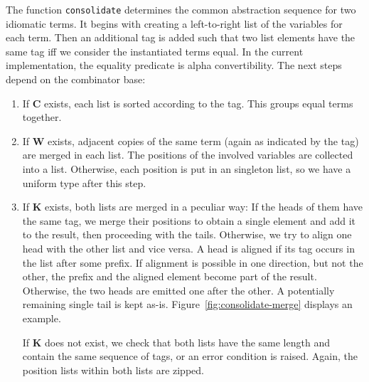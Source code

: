 The function \texttt{consolidate} determines the common abstraction sequence
for two idiomatic terms.
It begins with creating a left-to-right list of the variables for each term.
Then an additional tag is added such that two list elements have the same
tag iff we consider the instantiated terms equal.
In the current implementation, the equality predicate is alpha convertibility.
The next steps depend on the combinator base:
\begin{enumerate}
\item If $\mathbf{C}$ exists, each list is sorted according to the tag.
	This groups equal terms together.
\item If $\mathbf{W}$ exists, adjacent copies of the same term (again as
	indicated by the tag) are merged in each list.
	The positions of the involved variables are collected into a list.
	Otherwise, each position is put in an singleton list, so we have a uniform
	type after this step.
\item If $\mathbf{K}$ exists, both lists are merged in a peculiar way:
	If the heads of them have the same tag, we merge their positions to obtain
	a single element and add it to the result, then proceeding with the tails.
	Otherwise, we try to align one head with the other list and vice versa.
	A head is aligned if its tag occurs in the list after some prefix.
	If alignment is possible in one direction, but not the other, the prefix
	and the aligned element become part of the result.
	Otherwise, the two heads are emitted one after the other.
	A potentially remaining single tail is kept as-is.
	Figure~\ref{fig:consolidate-merge} displays an example.

	If $\mathbf{K}$ does not exist, we check that both lists have the same
	length and contain the same sequence of tags, or an error condition is raised.
	Again, the position lists within both lists are zipped.
\end{enumerate}

